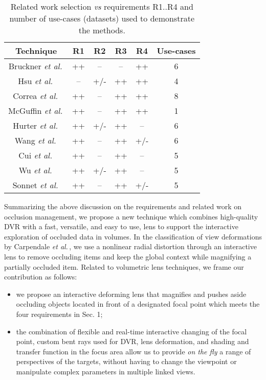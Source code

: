 \begin{table}[htbp]
\centering
\small
\begin{tabular}{ |c|c|c|c|c|c| }
\hline
\textbf{Technique} & \textbf{R1} & \textbf{R2} & \textbf{R3} & \textbf{R4} & \textbf{Use-cases}\\
\hline
\hline
Bruckner \emph{et al.}\,\cite{4015467} & ++ & -- & -- & ++ & 6\\
Hsu \emph{et al.}\,\cite{Hsu:2011:RFM:2070781.2024165} & -- & +/- & ++ & ++ & 4\\
Correa \emph{et al.}\,\cite{Correa:2006:FAV:1187627.1187827} & ++ & -- & ++ & ++ & 8\\
McGuffin \emph{et al.}\,\cite{1250400} & ++ & -- & ++ & ++ & 1\\
Hurter \emph{et al.}\,\cite{6787171} & ++ & +/- & ++ & -- & 6\\
Wang \emph{et al.}\,\cite{1532818} & ++ & -- & ++ & +/- & 6\\
Cui \emph{et al.}\,\cite{cui10} & ++ & -- & ++ & -- & 5\\
Wu \emph{et al.}\,\cite{wu16} & ++ & +/- & ++ & -- & 5\\
Sonnet \emph{et al.}\,\cite{Sonnet:2004:IEA:989863.989871} & ++ & -- & ++ & +/- & 5\\
\hline
\end{tabular}
\caption{Related work selection \emph{vs} requirements R1..R4 and number of use-cases (datasets) used to demonstrate the methods.}
\end{table}

Summarizing the above discussion on the requirements and related work on occlusion management, we propose a new technique which combines high-quality DVR with a fast, versatile, and easy to use, lens to support the interactive exploration of occluded data in volumes. In the classification of view deformations by Carpendale \emph{et al.}\,\cite{595268}, we use a nonlinear radial distortion through an interactive lens to remove occluding items and keep the global context while magnifying a partially occluded item. Related to volumetric lens techniques, we frame our contribution as follows:
 
\begin{itemize}
\item  we propose an interactive deforming lens that magnifies and pushes aside occluding objects located in front of a designated focal point which meets the four requirements in Sec. 1;
\item the combination of flexible and real-time interactive changing of the focal point, custom bent rays used for DVR, lens deformation, and shading and transfer function in the focus area allow us to provide \emph{on the fly} a range of perspectives of the targets, without having to change the viewpoint or manipulate complex parameters in multiple linked views.
\end{itemize}


